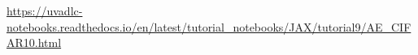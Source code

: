 

\url{https://uvadlc-notebooks.readthedocs.io/en/latest/tutorial_notebooks/JAX/tutorial9/AE_CIFAR10.html}





